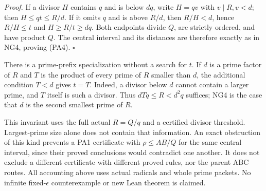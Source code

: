 \emph{Proof.} If a divisor $H$ contains $q$ and is below $dq$,
write $H=qv$ with $v\mid R,v<d$; then $H\leq qt\leq R/d$.
If it omits $q$ and is above $R/d$, then $R/H<d$, hence
$R/H\leq t$ and $H\geq R/t\geq dq$. Both endpoints divide $Q$,
are strictly ordered, and have product $Q$. The central interval
and its distances are therefore exactly as in NG4, proving (PA4).
$\square$

There is a prime-prefix specialization without a search for $t$.
If $d$ is a prime factor of $R$ and $T$ is the product of every
prime of $R$ smaller than $d$, the additional condition $T<d$
gives $t=T$. Indeed, a divisor below $d$ cannot contain a larger
prime, and $T$ itself is such a divisor. Thus
$dTq\leq R<d^2q$ suffices; NG4 is the case that $d$ is the second
smallest prime of $R$.

This invariant uses the full actual $R=Q/q$ and a certified divisor
threshold. Largest-prime size alone does not contain that information.
An exact obstruction of this kind prevents a PA1 certificate with
$\rho\leq AB/Q$ for the same central interval, since their proved
conclusions would contradict one another. It does not exclude a
different certificate with different proved rules, nor the parent
ABC routes. All accounting above uses actual radicals and whole
prime packets. No infinite fixed-$\epsilon$ counterexample or new
Lean theorem is claimed.
